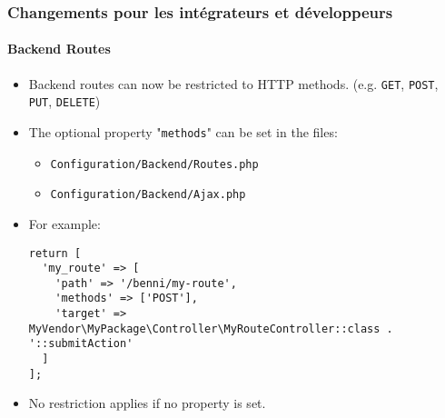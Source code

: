 %

\begin{frame}[fragile]
	\frametitle{Changements pour les intégrateurs et développeurs}
	\framesubtitle{Backend Routes}


	\begin{itemize}
		\item Backend routes can now be restricted to HTTP methods.\newline
			\small(e.g. \texttt{GET}, \texttt{POST}, \texttt{PUT}, \texttt{DELETE})
		\item The optional property "\texttt{methods}" can be set in the files:
			\begin{itemize}\smaller
				\item \texttt{Configuration/Backend/Routes.php}
				\item \texttt{Configuration/Backend/Ajax.php}
			\end{itemize}
			\vspace{0.2cm}
		\item For example:
\begin{lstlisting}
return [
  'my_route' => [
    'path' => '/benni/my-route',
    'methods' => ['POST'],
    'target' => MyVendor\MyPackage\Controller\MyRouteController::class . '::submitAction'
  ]
];
\end{lstlisting}

		\item No restriction applies if no property is set.

	\end{itemize}

\end{frame}

